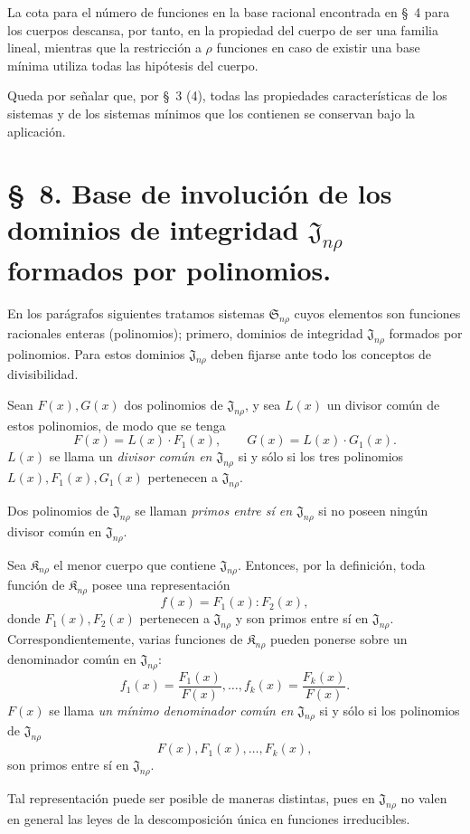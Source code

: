 \documentclass[11pt]{article}
\providecommand{\Kfield}{\mathfrak{K}}
\providecommand{\Ssys}{\mathfrak{S}}
\providecommand{\Jdom}{\mathfrak{J}}
\begin{document}
La cota para el número de funciones en la base racional encontrada en \S\ 4 para los cuerpos descansa, por tanto, en la propiedad del cuerpo de ser una familia lineal, mientras que la restricción a $\rho$ funciones en caso de existir una base mínima utiliza todas las hipótesis del cuerpo.

Queda por señalar que, por \S\ 3 (4), todas las propiedades características de los sistemas y de los sistemas mínimos que los contienen se conservan bajo la aplicación.

\section*{\S\ 8. Base de involución de los dominios de integridad $\Jdom_{n\rho}$ formados por polinomios.}

En los parágrafos siguientes tratamos sistemas $\Ssys_{n\rho}$ cuyos elementos son funciones racionales enteras (polinomios); primero, dominios de integridad $\Jdom_{n\rho}$ formados por polinomios. Para estos dominios $\Jdom_{n\rho}$ deben fijarse ante todo los conceptos de divisibilidad.

Sean $F(x),G(x)$ dos polinomios de $\Jdom_{n\rho}$, y sea $L(x)$ un divisor común de estos polinomios, de modo que se tenga
\[
  F(x)=L(x)\cdot F_1(x),\qquad G(x)=L(x)\cdot G_1(x).
\]
$L(x)$ se llama un \emph{divisor común en $\Jdom_{n\rho}$} si y sólo si los tres polinomios $L(x),F_1(x),G_1(x)$ pertenecen a $\Jdom_{n\rho}$.

Dos polinomios de $\Jdom_{n\rho}$ se llaman \emph{primos entre sí en $\Jdom_{n\rho}$} si no poseen ningún divisor común en $\Jdom_{n\rho}$.

Sea $\Kfield_{n\rho}$ el menor cuerpo que contiene $\Jdom_{n\rho}$. Entonces, por la definición, toda función de $\Kfield_{n\rho}$ posee una representación
\[
  f(x)=F_1(x):F_2(x),
\]
donde $F_1(x),F_2(x)$ pertenecen a $\Jdom_{n\rho}$ y son primos entre sí en $\Jdom_{n\rho}$. Correspondientemente, varias funciones de $\Kfield_{n\rho}$ pueden ponerse sobre un denominador común en $\Jdom_{n\rho}$:
\[
  f_1(x)=\frac{F_1(x)}{F(x)},\ldots,
  f_k(x)=\frac{F_k(x)}{F(x)}.
\]
$F(x)$ se llama \emph{un mínimo denominador común en $\Jdom_{n\rho}$} si y sólo si los polinomios de $\Jdom_{n\rho}$
\[
  F(x),F_1(x),\ldots,F_k(x),
\]
son primos entre sí en $\Jdom_{n\rho}$.

Tal representación puede ser posible de maneras distintas, pues en $\Jdom_{n\rho}$ no valen en general las leyes de la descomposición única en funciones irreducibles.
\end{document}
